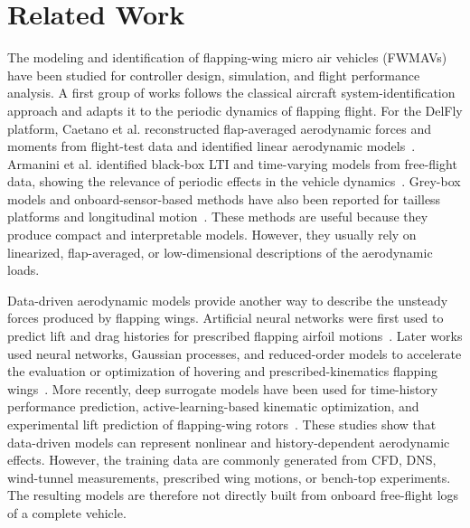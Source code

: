 \section{Related Work}
The modeling and identification of flapping-wing micro air vehicles (FWMAVs) have been studied for controller design, simulation, and flight performance analysis. A first group of works follows the classical aircraft system-identification approach and adapts it to the periodic dynamics of flapping flight. For the DelFly platform, Caetano et al. reconstructed flap-averaged aerodynamic forces and moments from flight-test data and identified linear aerodynamic models~\cite{caetano_linear_2013}. Armanini et al. identified black-box LTI and time-varying models from free-flight data, showing the relevance of periodic effects in the vehicle dynamics~\cite{armanini_black-box_2015,armanini_time-varying_2016}. Grey-box models and onboard-sensor-based methods have also been reported for tailless platforms and longitudinal motion~\cite{nijboer_longitudinal_2020,aurecianus_longitudinal_2022}. These methods are useful because they produce compact and interpretable models. However, they usually rely on linearized, flap-averaged, or low-dimensional descriptions of the aerodynamic loads.

Data-driven aerodynamic models provide another way to describe the unsteady forces produced by flapping wings. Artificial neural networks were first used to predict lift and drag histories for prescribed flapping airfoil motions~\cite{kurtulus_ability_2009}. Later works used neural networks, Gaussian processes, and reduced-order models to accelerate the evaluation or optimization of hovering and prescribed-kinematics flapping wings~\cite{nguyen_neural-network-based_2019,calado_robust_2023,lan_neural_2022}. More recently, deep surrogate models have been used for time-history performance prediction, active-learning-based kinematic optimization, and experimental lift prediction of flapping-wing rotors~\cite{wang_time-history_2024,corban_discovering_2023,chen_data-driven_2026}. These studies show that data-driven models can represent nonlinear and history-dependent aerodynamic effects. However, the training data are commonly generated from CFD, DNS, wind-tunnel measurements, prescribed wing motions, or bench-top experiments. The resulting models are therefore not directly built from onboard free-flight logs of a complete vehicle.

